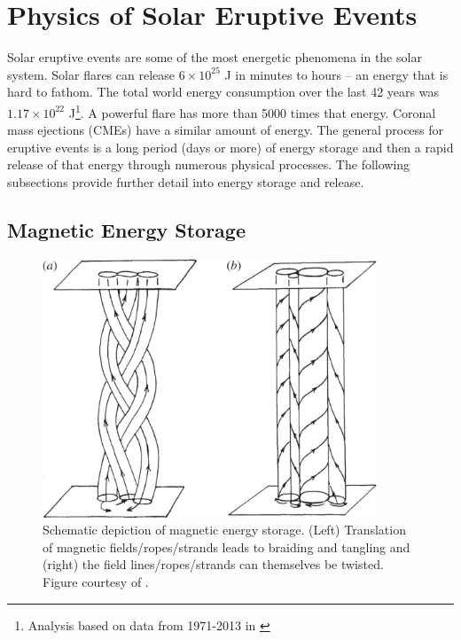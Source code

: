 \section{Physics of Solar Eruptive Events}
\label{sec:physicssolareruptiveevents}
Solar eruptive events are some of the most energetic phenomena in the solar system. Solar flares can release $6 \times 10^{25}$ J in minutes to hours -- an energy that is hard to fathom. The total world energy consumption over the last 42 years was $1.17 \times 10^{22}$ J\footnote{Analysis based on data from 1971-2013 in \citet{iea2015}}. A powerful flare has more than 5000 times that energy. Coronal mass ejections (CMEs) have a similar amount of energy. The general process for eruptive events is a long period (days or more) of energy storage and then a rapid release of that energy through numerous physical processes. The following subsections provide further detail into energy storage and release.

\subsection{Magnetic Energy Storage}

\begin{figure}[!h]
    \begin{center}
	    \includegraphics[width=100mm]{Images/MagneticEnergyStorage.png}
    \end{center}
    \caption[Magnetic energy storage diagram]{
        Schematic depiction of magnetic energy storage. (Left) Translation of magnetic fields/ropes/strands leads to 
        braiding and tangling and (right) the field lines/ropes/strands can themselves be twisted. Figure courtesy of 
        \citet{Klimchuk2015}. 
    }
    \label{fig:magneticenergystorage}
\end{figure}

